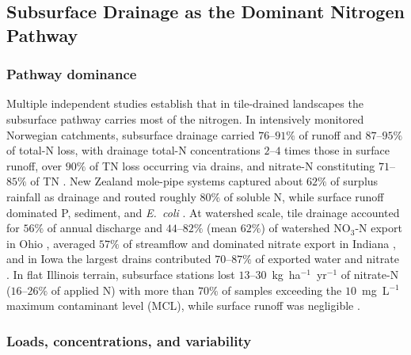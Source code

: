 \documentclass[11pt]{article}
\begin{document}
\subsection{Subsurface Drainage as the Dominant Nitrogen Pathway}

\subsubsection{Pathway dominance}

Multiple independent studies establish that in tile-drained landscapes the
subsurface pathway carries most of the nitrogen. In intensively monitored
Norwegian catchments, subsurface drainage carried $76$--$91\%$ of runoff
and $87$--$95\%$ of total-N loss, with drainage total-N concentrations
$2$--$4$ times those in surface runoff, over $90\%$ of TN loss occurring
via drains, and nitrate-N constituting $71$--$85\%$ of TN
\parencite{Bechmann2014}. New Zealand mole-pipe systems captured about
$62\%$ of surplus rainfall as drainage and routed roughly $80\%$ of soluble
N, while surface runoff dominated P, sediment, and \emph{E.\ coli}
\parencite{Monaghan2016}. At watershed scale, tile drainage accounted for
$56\%$ of annual discharge and $44$--$82\%$ (mean $62\%$) of watershed
NO$_3$-N export in Ohio \parencite{Williams2015}, averaged $57\%$ of
streamflow and dominated nitrate export in Indiana \parencite{Grose2022},
and in Iowa the largest drains contributed $70$--$87\%$ of exported water
and nitrate \parencite{Coupe2020}. In flat Illinois terrain, subsurface
stations lost $13$--$30$~kg~ha$^{-1}$~yr$^{-1}$ of nitrate-N
($16$--$26\%$ of applied N) with more than $70\%$ of samples exceeding the
$10$~mg~L$^{-1}$ maximum contaminant level (MCL), while surface runoff was
negligible \parencite{Dattamudi2020}.

\subsubsection{Loads, concentrations, and variability}
\end{document}
